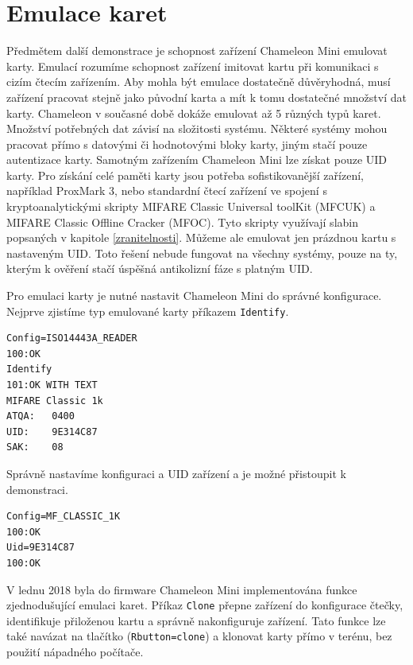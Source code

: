 \section{Emulace karet}
Předmětem další demonstrace je schopnost zařízení Chameleon Mini emulovat karty. Emulací rozumíme schopnost zařízení imitovat kartu při komunikaci s cizím čtecím zařízením. Aby mohla být emulace dostatečně důvěryhodná, musí zařízení pracovat stejně jako původní karta a mít k tomu dostatečné množství dat karty. Chameleon v současné době dokáže emulovat až 5 různých typů karet. Množství potřebných dat závisí na složitosti systému. Některé systémy mohou pracovat přímo s datovými či hodnotovými bloky karty, jiným stačí pouze autentizace karty. Samotným zařízením Chameleon Mini lze získat pouze UID karty. Pro získání celé paměti karty jsou potřeba sofistikovanější zařízení, například ProxMark 3, nebo standardní čtecí zařízení ve spojení s kryptoanalytickými skripty MIFARE Classic Universal toolKit (MFCUK) a MIFARE Classic Offline Cracker (MFOC)\cite{RelayUtokBP}. Tyto skripty využívají slabin popsaných v kapitole \ref{zranitelnosti}.
Můžeme ale emulovat jen prázdnou kartu s nastaveným UID. Toto řešení nebude fungovat na všechny systémy, pouze na ty, kterým k ověření stačí úspěšná antikolizní fáze s platným UID.\par
Pro emulaci karty je nutné nastavit Chameleon Mini do správné konfigurace. Nejprve zjistíme typ emulované karty příkazem \verb|Identify|.

\begin{lstlisting}[caption=Záznam postupu identifikace karty, label={ChameleonIdentify}]
Config=ISO14443A_READER
100:OK
Identify
101:OK WITH TEXT
MIFARE Classic 1k
ATQA:   0400
UID:    9E314C87
SAK:    08
\end{lstlisting}

Správně nastavíme konfiguraci a UID zařízení a je možné přistoupit k demonstraci.

\begin{lstlisting}[caption=Záznam nastavení emulace karty, label={ChameleonSetting}]
Config=MF_CLASSIC_1K
100:OK
Uid=9E314C87
100:OK
\end{lstlisting}

V lednu 2018 byla do firmware Chameleon Mini implementována funkce zjednodušující emulaci karet. Příkaz \verb|Clone| přepne zařízení do konfigurace čtečky, identifikuje přiloženou kartu a správně nakonfiguruje zařízení. Tato funkce lze také navázat na tlačítko (\verb|Rbutton=clone|) a klonovat karty přímo v terénu, bez použití nápadného počítače.

